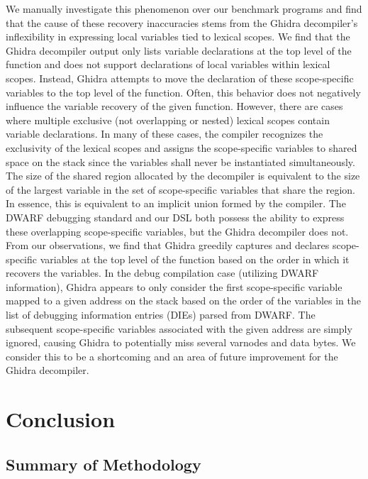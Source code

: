 \documentclass[conference]{IEEEtran}
\begin{document}
We manually investigate this phenomenon over our benchmark programs and find that the cause of these recovery inaccuracies stems from the Ghidra decompiler's inflexibility in expressing local variables tied to lexical scopes. We find that the Ghidra decompiler output only lists variable declarations at the top level of the function and does not support declarations of local variables within lexical scopes. Instead, Ghidra attempts to move the declaration of these scope-specific variables to the top level of the function. Often, this behavior does not negatively influence the variable recovery of the given function. However, there are cases where multiple exclusive (not overlapping or nested) lexical scopes contain variable declarations. In many of these cases, the compiler recognizes the exclusivity of the lexical scopes and assigns the scope-specific variables to shared space on the stack since the variables shall never be instantiated simultaneously. The size of the shared region allocated by the decompiler is equivalent to the size of the largest variable in the set of scope-specific variables that share the region. In essence, this is equivalent to an implicit union formed by the compiler. The DWARF debugging standard and our DSL both possess the ability to express these overlapping scope-specific variables, but the Ghidra decompiler does not. From our observations, we find that Ghidra greedily captures and declares scope-specific variables at the top level of the function based on the order in which it recovers the variables. In the debug compilation case (utilizing DWARF information), Ghidra appears to only consider the first scope-specific variable mapped to a given address on the stack based on the order of the variables in the list of debugging information entries (DIEs) parsed from DWARF. The subsequent scope-specific variables associated with the given address are simply ignored, causing Ghidra to potentially miss several varnodes and data bytes. We consider this to be a shortcoming and an area of future improvement for the Ghidra decompiler.

\section{Conclusion} \label{sec:conclusion}

\subsection{Summary of Methodology}
\end{document}
